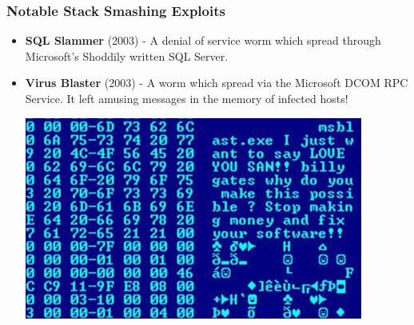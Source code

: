 \documentclass{beamer}
\begin{document}
\begin{frame}
    \frametitle{Notable Stack Smashing Exploits}
    \begin{itemize}[<+->]
        \item  {\bf SQL Slammer} (2003) - A denial of service worm which spread through Microsoft's Shoddily written SQL Server.  
        \item {\bf Virus Blaster} (2003) - A worm which spread via the Microsoft DCOM RPC Service.  It left amusing messages in the memory of infected hosts! \par\includegraphics[height=0.5\textheight]{images/Virus_Blaster}
    \end{itemize}
\end{frame}
\end{document}
